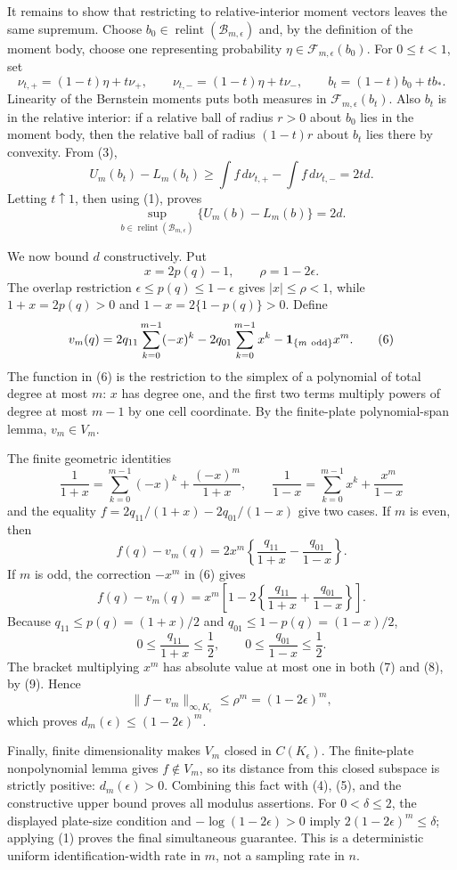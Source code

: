 It remains to show that restricting to relative-interior moment vectors leaves the same supremum.  Choose \(b_0\in\operatorname{relint}(\mathcal B_{m,\epsilon})\) and, by the definition of the moment body, choose one representing probability \(\eta\in\mathcal F_{m,\epsilon}(b_0)\).  For \(0\leq t<1\), set
\[
 \nu_{t,+}=(1-t)\eta+t\nu_+,\qquad
 \nu_{t,-}=(1-t)\eta+t\nu_-,\qquad
 b_t=(1-t)b_0+tb_*.
\]
Linearity of the Bernstein moments puts both measures in \(\mathcal F_{m,\epsilon}(b_t)\).  Also \(b_t\) is in the relative interior: if a relative ball of radius \(r>0\) about \(b_0\) lies in the moment body, then the relative ball of radius \((1-t)r\) about \(b_t\) lies there by convexity.  From (3),
\[
 U_m(b_t)-L_m(b_t)
 \geq\int f\,d\nu_{t,+}-\int f\,d\nu_{t,-}
 =2td.
\]
Letting \(t\uparrow1\), then using (1), proves
\[
 \sup_{b\in\operatorname{relint}(\mathcal B_{m,\epsilon})}
 \{U_m(b)-L_m(b)\}=2d. \tag{5}
\]

We now bound \(d\) constructively.  Put
\[
 x=2p(q)-1,\qquad \rho=1-2\epsilon.
\]
The overlap restriction \(\epsilon\leq p(q)\leq1-\epsilon\) gives \(|x|\leq\rho<1\), while \(1+x=2p(q)>0\) and \(1-x=2\{1-p(q)\}>0\).  Define
\[
 v_m(q)=2q_{11}\sum_{k=0}^{m-1}(-x)^k
          -2q_{01}\sum_{k=0}^{m-1}x^k
          -\mathbf 1_{\{m\ {\rm odd}\}}x^m. \tag{6}
\]
The function in (6) is the restriction to the simplex of a polynomial of total degree at most \(m\): \(x\) has degree one, and the first two terms multiply powers of degree at most \(m-1\) by one cell coordinate.  By the finite-plate polynomial-span lemma, \(v_m\in V_m\).

The finite geometric identities
\[
 \frac1{1+x}=\sum_{k=0}^{m-1}(-x)^k+\frac{(-x)^m}{1+x},
 \qquad
 \frac1{1-x}=\sum_{k=0}^{m-1}x^k+\frac{x^m}{1-x}
\]
and the equality \(f=2q_{11}/(1+x)-2q_{01}/(1-x)\) give two cases.  If \(m\) is even, then
\[
 f(q)-v_m(q)
 =2x^m\left\{\frac{q_{11}}{1+x}-\frac{q_{01}}{1-x}\right\}. \tag{7}
\]
If \(m\) is odd, the correction \(-x^m\) in (6) gives
\[
 f(q)-v_m(q)
 =x^m\left[1-2\left\{\frac{q_{11}}{1+x}+\frac{q_{01}}{1-x}\right\}\right]. \tag{8}
\]
Because \(q_{11}\leq p(q)=(1+x)/2\) and \(q_{01}\leq1-p(q)=(1-x)/2\),
\[
 0\leq\frac{q_{11}}{1+x}\leq\frac12,
 \qquad
 0\leq\frac{q_{01}}{1-x}\leq\frac12. \tag{9}
\]
The bracket multiplying \(x^m\) has absolute value at most one in both (7) and (8), by (9).  Hence
\[
 \|f-v_m\|_{\infty,K_{\epsilon}}\leq\rho^m=(1-2\epsilon)^m,
\]
which proves \(d_m(\epsilon)\leq(1-2\epsilon)^m\).

Finally, finite dimensionality makes \(V_m\) closed in \(C(K_{\epsilon})\).  The finite-plate nonpolynomial lemma gives \(f\notin V_m\), so its distance from this closed subspace is strictly positive: \(d_m(\epsilon)>0\).  Combining this fact with (4), (5), and the constructive upper bound proves all modulus assertions.  For \(0<\delta\leq2\), the displayed plate-size condition and \(-\log(1-2\epsilon)>0\) imply \(2(1-2\epsilon)^m\leq\delta\); applying (1) proves the final simultaneous guarantee.  This is a deterministic uniform identification-width rate in \(m\), not a sampling rate in \(n\).